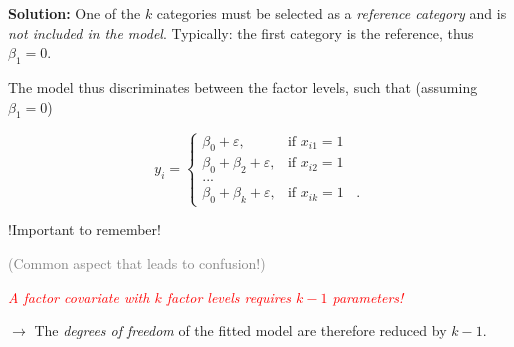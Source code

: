 \documentclass[10pt,ignorenonframetext,]{beamer}
\begin{document}
\begin{frame}

\textbf{Solution:} One of the \(k\) categories must be selected as a
\emph{reference category} and is \emph{not included in the model}.
Typically: the first category is the reference, thus \(\beta_1=0\).

\vspace{2mm}

The model thus discriminates between the factor levels, such that
(assuming \(\beta_1=0\))

\begin{equation*}
y_i = \left\{
\begin{array}{ll}
\beta_0 + \varepsilon, & \text{if $x_{i1}=1$ }\\
\beta_0 + \beta_2 + \varepsilon, & \text{if $x_{i2}=1$ }\\
...\\
\beta_0 + \beta_k + \varepsilon, & \text{if $x_{ik}=1$ } \ .
\end{array}\right.
\end{equation*}

\end{frame}

\begin{frame}

\begin{block}{!Important to remember!}

\textcolor{gray}{(Common aspect that leads to confusion!)}

\vspace{10mm}

\emph{\textcolor{red}{A factor covariate with $k$ factor levels requires $k-1$ parameters!}}
\vspace{2mm}

\(\rightarrow\) The \emph{degrees of freedom} of the fitted model are
therefore reduced by \(k-1\).

\end{block}

\end{frame}
\end{document}
